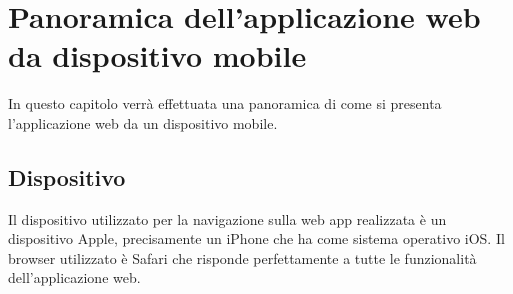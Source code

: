 \chapter{Panoramica dell'applicazione web da dispositivo mobile}

In questo capitolo verrà effettuata una panoramica di come si presenta l'applicazione web da un dispositivo mobile.
\newline

\section{Dispositivo}
Il dispositivo utilizzato per la navigazione sulla web app realizzata è un dispositivo Apple, precisamente un iPhone che ha come sistema operativo iOS. \newline
Il browser utilizzato è Safari che risponde perfettamente a tutte le funzionalità dell'applicazione web.
